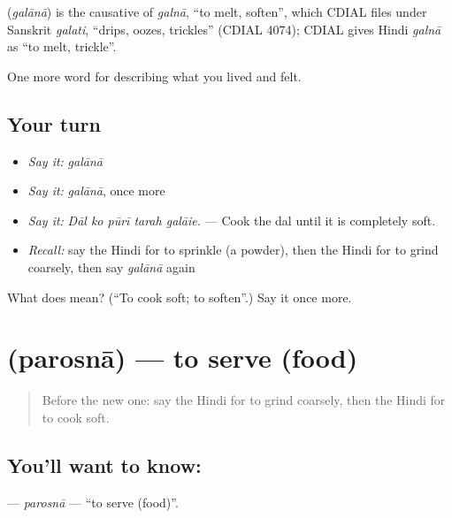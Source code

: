 \begin{cousinweb}
\textbf{} (\emph{galānā}) is the causative of \emph{galnā}, \textquotedblleft{}to melt, soften\textquotedblright{}, which CDIAL files under Sanskrit \emph{galati}, \textquotedblleft{}drips, oozes, trickles\textquotedblright{} (CDIAL 4074); CDIAL gives Hindi \emph{galnā} as \textquotedblleft{}to melt, trickle\textquotedblright{}.
\end{cousinweb}

\begin{grammarlens}[title={What you've built}]
One more word for describing what you lived and felt.
\end{grammarlens}

\subsection*{Your turn}
\begin{itemize}
\raggedright
  \item \emph{Say it:} \emph{galānā}
  \item \emph{Say it:} \emph{galānā}, once more
  \item \emph{Say it:} \emph{Dāl ko pūrī tarah galāie.} — Cook the dal until it is completely soft.
  \item \emph{Recall:} say the Hindi for to sprinkle (a powder), then the Hindi for to grind coarsely, then say \emph{galānā} again
\end{itemize}

\begin{tcolorbox}[breakable,colback=teal!4,colframe=teal!35!black,title={Before you move on}]
What does  mean? (\textquotedblleft{}To cook soft; to soften\textquotedblright{}.) Say it once more.
\end{tcolorbox}
\section[\texorpdfstring{\hi{परोसना} (parosnā)}{परोसना (parosnā)}]{ (parosnā) — to serve (food)}

\label{lesson:HI-C524-parosna}



\begin{quote}
Before the new one: say the Hindi for to grind coarsely, then the Hindi for to cook soft.
\end{quote}

\subsection*{You'll want to know: }
\textbf{} — \emph{parosnā} — \textquotedblleft{}to serve (food)\textquotedblright{}.


